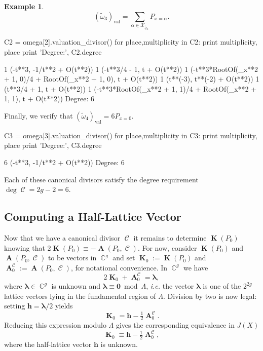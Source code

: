 \documentclass[12pt]{article}
\theoremstyle{definition}
\newtheorem{example}[theorem]{Example}
\DeclareMathOperator{\CC}{\mathbb{C}}
\DeclareMathOperator{\DivC}{\mathcal{C}}
\DeclareMathOperator{\RCV}{\boldsymbol{K}}
\DeclareMathOperator{\Abel}{\boldsymbol{A}}
\begin{document}
\begin{example}
\begin{equation}
  (\tilde{\omega}_3)_\text{val}
  =
  \sum_{\alpha \in \mathcal{X}_{\tilde{\omega}_3}} P_{x=\alpha}.
\end{equation}
\begin{ipythoninput}
C2 = omega[2].valuation_divisor()
for place,multiplicity in C2:
    print multiplicity, place
print 'Degree:', C2.degree
\end{ipythoninput}
\begin{ipythonoutput}
1 (-t**3, -1/t**2 + O(t**2))
1 (-t**3/4 - 1, t + O(t**2))
1 (-t**3*RootOf(_x**2 + 1, 0)/4 + RootOf(_x**2 + 1, 0), t + O(t**2))
1 (t**(-3), t**(-2) + O(t**2))
1 (t**3/4 + 1, t + O(t**2))
1 (-t**3*RootOf(_x**2 + 1, 1)/4 + RootOf(_x**2 + 1, 1), t + O(t**2))
Degree: 6
\end{ipythonoutput}
Finally, we verify that $(\tilde{\omega}_4)_\text{val} = 6P_{x=0}$.
\begin{ipythoninput}
C3 = omega[3].valuation_divisor()
for place,multiplicity in C3:
    print multiplicity, place
print 'Degree:', C3.degree
\end{ipythoninput}
\begin{ipythonoutput}
6 (-t**3, -1/t**2 + O(t**2))
Degree: 6
\end{ipythonoutput}
Each of these canonical divisors satisfy the degree requirement $\deg
\DivC = 2g-2 = 6$.
\end{example}




\subsection{Computing a Half-Lattice Vector}


Now that we have a canonical divisor $\DivC$ it remains to determine
$\RCV(P_0)$ knowing that $2\RCV(P_0) \equiv - \Abel(P_0,\DivC)$. For
now, consider $\RCV(P_0)$ and $\Abel(P_0,\DivC)$ to be vectors in
$\CC^g$ and set $\RCV_0 := \RCV(P_0)$ and $\Abel_0^{\DivC} :=
\Abel(P_0,\DivC)$, for notational convenience. In $\CC^g$ we have
\begin{equation}
2\RCV_0 + \Abel_0^{\DivC} = \boldsymbol{\lambda},
\end{equation}
where $\boldsymbol{\lambda} \in \CC^g$ is unknown and
$\boldsymbol{\lambda} \equiv \boldsymbol{0} \bmod{\Lambda}$, {\it i.e.}
the vector $\boldsymbol{\lambda}$ is one of the $2^{2g}$ lattice vectors
lying in the fundamental region of $\Lambda$. Division by two is now
legal: setting $\boldsymbol{h} = \boldsymbol{\lambda}/2$ yields
\begin{equation}
\RCV_0 = \boldsymbol{h} - \tfrac{1}{2} \Abel_0^{\DivC}.
\end{equation}
Reducing this expression modulo $\Lambda$ gives the corresponding
equivalence in $J(X)$
\begin{equation}
\RCV_0 \equiv \boldsymbol{h} - \tfrac{1}{2} \Abel_0^{\DivC},
\end{equation}
where the half-lattice vector $\boldsymbol{h}$ is unknown.
\end{document}
